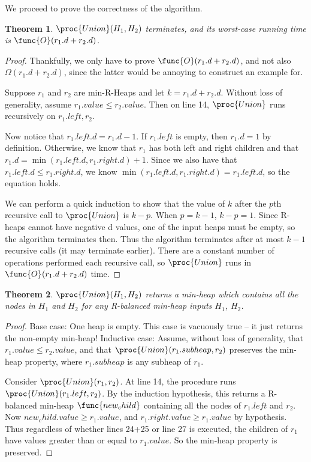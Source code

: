 \documentclass[11pt, answers]{exam}
\theoremstyle{plain}
\newtheorem{theorem}{Theorem}
\theoremstyle{definition}
\begin{document}
\begin{questions}
\begin{parts}
\begin{solution}
We proceed to prove the correctness of the algorithm. \\

\begin{theorem}
$\proc{Union}(H_1, H_2)$ terminates, and its worst-case running time is $\func{O}(r_1 .d + r_2 .d)$.
\end{theorem}

\begin{proof}
Thankfully, we only have to prove $\func{O}(r_1 .d + r_2 .d)$, and not also $\Omega(r_1 .d + r_2 .d)$, since the latter would be annoying to construct an example for. 

Suppose $r_1$ and $r_2$ are min-R-Heaps and let $k = r_1 .d + r_2 .d$. Without loss of generality, assume $r_1.value \leq r_2.value$. Then on line 14, $\proc{Union}$ runs recursively on $r_1.left, r_2$. 

Now notice that $r_1.left.d = r_1.d - 1$. If $r_1.left$ is empty, then $r_1.d = 1$ by definition. Otherwise, we know that $r_1$ has both left and right children and that $r_1.d = \min(r_1.left.d, r_1.right.d) + 1$. Since we also have that $r_1.left.d  \leq r_1.right.d$, we know
$\min(r_1.left.d, r_1.right.d) = r_1.left.d$, so the equation holds.

We can perform a quick induction to show that the value of $k$ after the $p$th recursive call to $\proc{Union}$ is $k-p$. When $p = k-1$, $k-p = 1$. Since R-heaps cannot have negative d values, one of the input heaps must be empty, so the algorithm terminates then. Thus the algorithm terminates after at most $k-1$ recursive calls (it may terminate earlier). There are a constant number of operations performed each recursive call, so $\proc{Union}$ runs in $\func{O}(r_1 .d + r_2 .d)$ time.
\end{proof}

\begin{theorem}
$\proc{Union}(H_1, H_2)$ returns a min-heap which contains all the nodes in $H_1$ and $H_2$ for any R-balanced min-heap inputs $H_1$, $H_2$.
\end{theorem}

\begin{proof}
Base case: One heap is empty. This case is vacuously true -- it just returns the non-empty min-heap!
Inductive case: Assume, without loss of generality, that $r_1.value \leq r_2.value$, and that $\proc{Union}(r_1.subheap, r_2)$ preserves the min-heap property, where $r_1.subheap$ is any subheap of $r_1$.

Consider $\proc{Union}(r_1, r_2)$. At line 14, the procedure runs $\proc{Union}(r_1.left, r_2)$. By the induction hypothesis, this returns a R-balanced min-heap $\func{new_child}$ containing all the nodes of $r_1.left$ and $r_2$. Now $new_child.value \geq r_1.value$, and $r_1.right.value \geq r_1.value$ by hypothesis. Thus regardless of whether lines 24+25 or line 27 is executed, the children of $r_1$ have values greater than or equal to $r_1.value$. So the min-heap property is preserved.


\end{proof}
\end{solution}
\end{parts}
\end{questions}
\end{document}

